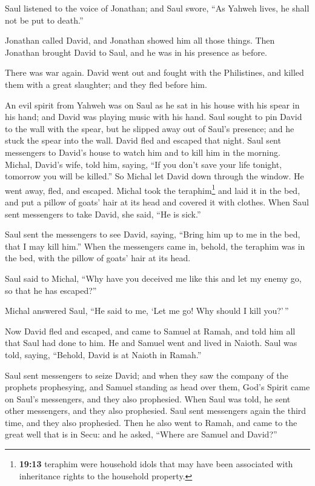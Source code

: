  Saul listened to the voice of Jonathan; and Saul swore,
``As Yahweh lives, he shall not be put to death.''

 Jonathan called David, and Jonathan showed him all those
things. Then Jonathan brought David to Saul, and he was in his presence
as before.

 There was war again. David went out and fought with the
Philistines, and killed them with a great slaughter; and they fled
before him.

 An evil spirit from Yahweh was on Saul as he sat in his
house with his spear in his hand; and David was playing music with his
hand.  Saul sought to pin David to the wall with the
spear, but he slipped away out of Saul's presence; and he stuck the
spear into the wall. David fled and escaped that night. 
Saul sent messengers to David's house to watch him and to kill him in
the morning. Michal, David's wife, told him, saying, ``If you don't save
your life tonight, tomorrow you will be killed.''  So
Michal let David down through the window. He went away, fled, and
escaped.  Michal took the teraphim\footnote{\textbf{19:13}
  teraphim were household idols that may have been associated with
  inheritance rights to the household property.} and laid it in the bed,
and put a pillow of goats' hair at its head and covered it with clothes.
 When Saul sent messengers to take David, she said, ``He
is sick.''

 Saul sent the messengers to see David, saying, ``Bring
him up to me in the bed, that I may kill him.''  When the
messengers came in, behold, the teraphim was in the bed, with the pillow
of goats' hair at its head.

 Saul said to Michal, ``Why have you deceived me like
this and let my enemy go, so that he has escaped?''

Michal answered Saul, ``He said to me, `Let me go! Why should I kill
you?'\,''

 Now David fled and escaped, and came to Samuel at Ramah,
and told him all that Saul had done to him. He and Samuel went and lived
in Naioth.  Saul was told, saying, ``Behold, David is at
Naioth in Ramah.''

 Saul sent messengers to seize David; and when they saw
the company of the prophets prophesying, and Samuel standing as head
over them, God's Spirit came on Saul's messengers, and they also
prophesied.  When Saul was told, he sent other
messengers, and they also prophesied. Saul sent messengers again the
third time, and they also prophesied.  Then he also went
to Ramah, and came to the great well that is in Secu: and he asked,
``Where are Samuel and David?''

